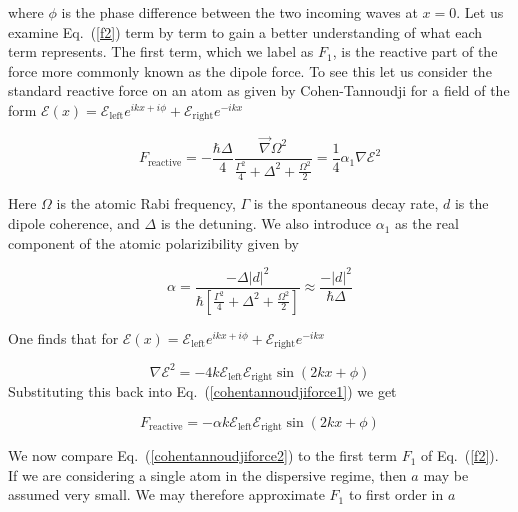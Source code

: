 where $\phi$ is the phase difference between the two incoming waves at $x=0$. Let us examine Eq.\ (\ref{f2}) term by term to gain a better understanding
of what each term represents. The first term, which we label as $F_{1}$, is the reactive part of the force more commonly known as the dipole force. To see this let us consider the standard reactive force on an atom as given by Cohen-Tannoudji \cite{cohentannoudji} for a field of the form $\mathcal{E}(x)=\mathcal{E}_{\mathrm{left}}e^{ikx+i\phi}+\mathcal{E}_{\mathrm{right}}e^{-ikx}$ 

\begin{equation}
F_{\mathrm{reactive}}=-\frac{\hbar\Delta}{4}\frac{\overrightarrow{\nabla}\Omega^{2}}{\frac{\Gamma^{2}}{4}+\Delta^{2}+\frac{\Omega^{2}}{2}}=\frac{1}{4}\alpha_{1}\nabla \mathcal{E}^{2}
\label{cohentannoudjiforce1}
\end{equation}

Here $\Omega$ is the atomic Rabi frequency, $\Gamma$ is the spontaneous decay rate, $d$ is the dipole coherence, and $\Delta$ is the detuning.
We also introduce $\alpha_{1}$ as the real component of the atomic polarizibility given by

\begin{equation}
\alpha=\frac{-\Delta\left|d\right|^{2}}{\hbar\left[\frac{\Gamma^{2}}{4}+\Delta^{2}+\frac{\Omega^{2}}{2}\right]}\approx\frac{-\left|d\right|^{2}}{\hbar\Delta}
\label{polarizibility1}
\end{equation}

One finds that for $\mathcal{E}(x)=\mathcal{E}_{\mathrm{left}}e^{ikx+i\phi}+\mathcal{E}_{\mathrm{right}}e^{-ikx}$

\begin{equation}
\nabla \mathcal{E}^{2}=-4k\mathcal{E}_{\mathrm{left}}\mathcal{E}_{\mathrm{right}}\sin\left(2kx+\phi\right)
\label{gradiantE}
\end{equation}
Substituting this back into Eq.\ (\ref{cohentannoudjiforce1}) we get

\begin{equation}
F_{\mathrm{reactive}}=-\alpha k\mathcal{E}_{\mathrm{left}}\mathcal{E}_{\mathrm{right}}\sin\left(2kx+\phi\right)
\label{cohentannoudjiforce2}
\end{equation}

We now compare Eq.\ (\ref{cohentannoudjiforce2}) to the first term $F_{1}$ of Eq.\ (\ref{f2}). If we are considering a single atom in the dispersive regime, then
$a$ may be assumed very small. We may therefore approximate $F_{1}$ to first order in $a$ 

